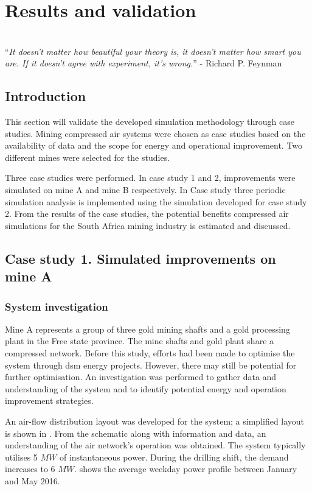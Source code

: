 \chapter{Results and validation}
\thispagestyle{empty}
\vspace{38em}
\hrulefill
\\

\enquote{\textit{It doesn't matter how beautiful your theory is, it doesn't matter how smart you are. If it doesn't agree with experiment, it's wrong.}} - Richard P. Feynman\\
\newpage
\section{Introduction}
This section will validate the developed simulation methodology through case studies. Mining compressed air systems were chosen as case studies based on the availability of data and the scope for energy and operational improvement. Two different mines were selected for the studies. 
\par 
Three case studies were performed. In case study 1 and 2, improvements were simulated on mine A and mine B respectively. In Case study three periodic simulation analysis is implemented using the simulation developed for case study 2. From the results of the case studies, the potential benefits compressed air simulations for the South Africa mining industry is estimated and discussed.

\section{Case study 1. Simulated improvements on mine A}
\subsection{System investigation}
Mine A represents a group of three gold mining shafts and a gold processing plant in the Free state province. The mine shafts and gold plant share a compressed network. Before this study, efforts had been made to optimise the system through \gls{dsm} energy projects. However, there may still be potential for further optimisation. An investigation was performed to gather data and understanding of the system and to identify potential energy and operation improvement strategies.
\par 
An air-flow distribution layout was developed for the system; a simplified layout is shown in . From the schematic along with information and data, an understanding of the air network’s operation was obtained. The system typically utilises 5 $MW$ of instantaneous power. During the drilling shift, the demand increases to 6 $MW$.  shows the average weekday power profile between January and May 2016.

